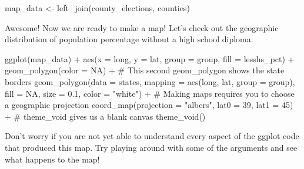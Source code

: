 \documentclass[
  letterpaper,
]{book}
\newenvironment{Shaded}{\begin{snugshade}}{\end{snugshade}}
\newcommand{\AttributeTok}[1]{\textcolor[rgb]{0.40,0.45,0.13}{#1}}
\newcommand{\CommentTok}[1]{\textcolor[rgb]{0.37,0.37,0.37}{#1}}
\newcommand{\ConstantTok}[1]{\textcolor[rgb]{0.56,0.35,0.01}{#1}}
\newcommand{\DecValTok}[1]{\textcolor[rgb]{0.68,0.00,0.00}{#1}}
\newcommand{\FloatTok}[1]{\textcolor[rgb]{0.68,0.00,0.00}{#1}}
\newcommand{\FunctionTok}[1]{\textcolor[rgb]{0.28,0.35,0.67}{#1}}
\newcommand{\NormalTok}[1]{\textcolor[rgb]{0.00,0.23,0.31}{#1}}
\newcommand{\OtherTok}[1]{\textcolor[rgb]{0.00,0.23,0.31}{#1}}
\newcommand{\SpecialCharTok}[1]{\textcolor[rgb]{0.37,0.37,0.37}{#1}}
\newcommand{\StringTok}[1]{\textcolor[rgb]{0.13,0.47,0.30}{#1}}
\theoremstyle{definition}
\theoremstyle{definition}
\theoremstyle{plain}
\theoremstyle{definition}
\theoremstyle{plain}
\theoremstyle{plain}
\theoremstyle{remark}
\begin{document}
\begin{Shaded}
\begin{Highlighting}[]
\NormalTok{map\_data }\OtherTok{\textless{}{-}} \FunctionTok{left\_join}\NormalTok{(county\_elections, counties)}
\end{Highlighting}
\end{Shaded}

Awesome! Now we are ready to make a map! Let's check out the geographic
distribution of population percentage without a high school diploma.

\begin{Shaded}
\begin{Highlighting}[]
\FunctionTok{ggplot}\NormalTok{(map\_data) }\SpecialCharTok{+}
  \FunctionTok{aes}\NormalTok{(}\AttributeTok{x =}\NormalTok{ long, }\AttributeTok{y =}\NormalTok{ lat, }
      \AttributeTok{group =}\NormalTok{ group, }\AttributeTok{fill =}\NormalTok{ lesshs\_pct) }\SpecialCharTok{+}
  \FunctionTok{geom\_polygon}\NormalTok{(}\AttributeTok{color =} \ConstantTok{NA}\NormalTok{) }\SpecialCharTok{+}
  \CommentTok{\# This second geom\_polygon shows the state borders}
  \FunctionTok{geom\_polygon}\NormalTok{(}\AttributeTok{data =}\NormalTok{ states, }\AttributeTok{mapping =} \FunctionTok{aes}\NormalTok{(long, lat, }\AttributeTok{group =}\NormalTok{ group),}
               \AttributeTok{fill =} \ConstantTok{NA}\NormalTok{, }\AttributeTok{size =} \FloatTok{0.1}\NormalTok{, }\AttributeTok{color =} \StringTok{"white"}\NormalTok{) }\SpecialCharTok{+}
  \CommentTok{\# Making maps requires you to choose a geographic projection}
  \FunctionTok{coord\_map}\NormalTok{(}\AttributeTok{projection =} \StringTok{"albers"}\NormalTok{, }\AttributeTok{lat0 =} \DecValTok{39}\NormalTok{, }\AttributeTok{lat1 =} \DecValTok{45}\NormalTok{) }\SpecialCharTok{+}
  \CommentTok{\# theme\_void gives us a blank canvas}
  \FunctionTok{theme\_void}\NormalTok{()}
\end{Highlighting}
\end{Shaded}

Don't worry if you are not yet able to understand every aspect of the
ggplot code that produced this map. Try playing around with some of the
arguments and see what happens to the map!
\end{document}

